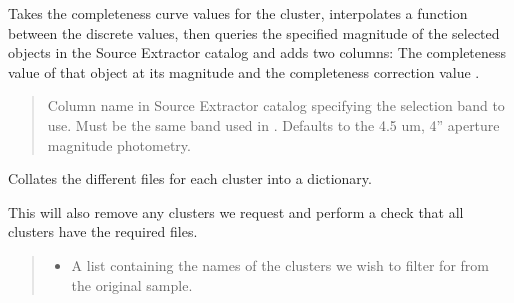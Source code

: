 \documentclass[letterpaper,12pt,english]{sphinxmanual}
\begin{document}
\begin{fulllineitems}
\begin{fulllineitems}
\sphinxAtStartPar
Takes the completeness curve values for the cluster, interpolates a function between the discrete values, then
queries the specified magnitude of the selected objects in the Source Extractor catalog and adds two columns:
The completeness value of that object at its magnitude and the completeness correction value
.
\begin{quote}\begin{description}
\sphinxAtStartPar
{} \textendash{} Column name in Source Extractor catalog specifying the selection band to use. Must be the same band used in
. Defaults to the 4.5 um, 4” aperture magnitude photometry.

\end{description}\end{quote}

\end{fulllineitems}


\begin{fulllineitems}
\label{\detokenize{api/selector:SPTclIRAGN.Pipeline_functions.SelectFullFieldSDWFS.file_pairing}}
\pysigstartsignatures
{}
\pysigstopsignatures
\sphinxAtStartPar
Collates the different files for each cluster into a dictionary.

\sphinxAtStartPar
This will also remove any clusters we request and perform a check that all clusters have the required files.
\begin{quote}\begin{description}
\begin{itemize}
\item {} 
\sphinxAtStartPar
{} \textendash{} A list containing the names of the clusters we wish to filter for from the original sample.


\end{itemize}
\end{description}
\end{quote}
\end{fulllineitems}
\end{fulllineitems}
\end{document}
